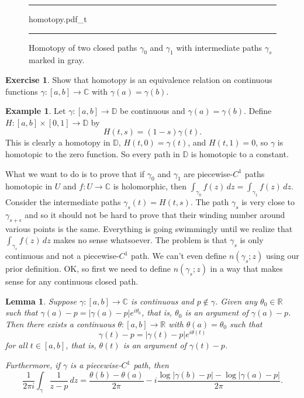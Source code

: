 \documentclass[12pt,openany]{book}
\newcommand{\sabs}[1]{\lvert {#1} \rvert}
\newcommand{\C}{{\mathbb{C}}}
\newcommand{\R}{{\mathbb{R}}}
\newcommand{\D}{{\mathbb{D}}}
\theoremstyle{plain}
\newtheorem{lemma}[thm]{Lemma}
\theoremstyle{remark}
\theoremstyle{definition}
\newenvironment{exbox}{%
    \def\FrameCommand{\vrule width 1pt \relax\hspace{10pt}}%
    \MakeFramed{\advance\hsize-\width\FrameRestore}%
}{%
    \endMakeFramed
}
\newenvironment{myfig}{%
\begin{figure}[h!t]
\noindent\rule{\textwidth}{0.5pt}\vspace{12pt}\par\centering}%
{\par\noindent\rule{\textwidth}{0.5pt}
\end{figure}}
\theoremstyle{exercise}
\newtheorem{exercise}{Exercise}[section]
\theoremstyle{example}
\newtheorem{example}[thm]{Example}
\begin{document}
\begin{myfig}
{homotopy.pdf_t}
\caption{Homotopy of two closed paths $\gamma_0$ and
$\gamma_1$ with intermediate paths $\gamma_s$ marked in gray.\label{fig:homotopy}}
\end{myfig}

\begin{exbox}
\begin{exercise}
Show that homotopy is an equivalence relation on continuous functions
$\gamma \colon [a,b] \to \C$ with $\gamma(a)=\gamma(b)$.
\end{exercise}
\end{exbox}

\begin{example} \label{example:homotopydiscsc}
Let $\gamma \colon [a,b] \to \D$ be continuous and $\gamma(a)=\gamma(b)$.  Define
$H \colon [a,b] \times [0,1] \to \D$ by
\begin{equation*}
H(t,s) = (1-s) \gamma(t) .
\end{equation*}
This is clearly a homotopy in $\D$, $H(t,0) = \gamma(t)$,
and $H(t,1) = 0$, so $\gamma$ is homotopic to the zero function.
So every path in $\D$ is homotopic to a constant.
\end{example}

What we want to do is to prove that if $\gamma_0$ and $\gamma_1$ are
piecewise-$C^1$ paths homotopic in $U$ and $f \colon U \to \C$ is holomorphic, then
$\int_{\gamma_0} f(z)\,dz = \int_{\gamma_1} f(z)\, dz$.
Consider the intermediate paths $\gamma_s(t) = H(t,s)$.
The path $\gamma_s$ is very close to
$\gamma_{s+\epsilon}$ and so it should not be hard to prove that their
winding number around various points is the same.
Everything is going swimmingly until we realize that $\int_{\gamma_s} f(z)
\, dz$ makes no sense whatsoever.  The problem is that $\gamma_s$ is only
continuous and not a piecewise-$C^1$ path.  We can't
even define $n(\gamma_s;z)$ using our prior definition.
OK\@, so first we need to define $n(\gamma_s;z)$ in a way that makes sense for
any continuous closed path.

\begin{lemma} \label{lemma:existenceoftheta}
Suppose $\gamma \colon [a,b] \to \C$ is continuous and $p \notin
\gamma$.  Given any $\theta_0 \in \R$ such that
$\gamma(a)-p = \sabs{\gamma(a)-p} e^{i\theta_0}$, that is,
$\theta_0$ is an argument of $\gamma(a)-p$.
Then there exists a continuous
$\theta \colon [a,b] \to \R$ with $\theta(a) = \theta_0$ such that
\begin{equation*}
\gamma(t)-p = \sabs{\gamma(t)-p} e^{i\theta(t)}
\end{equation*}
for all $t \in [a,b]$, that is, $\theta(t)$ is an argument of $\gamma(t)-p$.

Furthermore, if $\gamma$ is a piecewise-$C^1$ path, then
\begin{equation*}
\frac{1}{2\pi i} \int_\gamma \frac{1}{z-p} \, dz =
\frac{\theta(b)-\theta(a)}{2\pi} 
- i \frac{\log \sabs{\gamma(b)-p} - \log \sabs{\gamma(a)-p}}{2\pi} .
\end{equation*}
\end{lemma}
\end{document}
